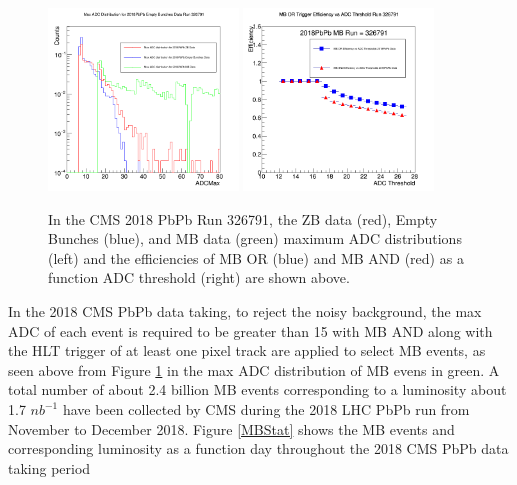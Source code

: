 \begin{figure}[hbtp]
\begin{center}
\includegraphics[width=0.45\textwidth]{Figures/Chapter2/MaxADC.png}
\includegraphics[width=0.45\textwidth]{Figures/Chapter2/MBTrgEffADC.png}
\caption{In the CMS 2018 PbPb Run 326791, the ZB data (red), Empty Bunches (blue), and MB data (green) maximum ADC distributions (left) and the efficiencies of MB OR (blue) and MB AND (red) as a function ADC threshold (right) are shown above.}
\label{2018PbPbMB}
\end{center}
\end{figure} 

In the 2018 CMS PbPb data taking, to reject the noisy background, the max ADC of each event is required to be greater than 15 with MB AND along with the HLT trigger of at least one pixel track are applied to select MB events, as seen above from Figure \ref{2018PbPbMB} in the max ADC distribution of MB evens in green. A total number of about 2.4 billion MB events corresponding to a luminosity about 1.7 $nb^{-1}$ have been collected by CMS during the 2018 LHC PbPb run from November to December 2018. Figure \ref{MBStat} shows the MB events and corresponding luminosity as a function day throughout the 2018 CMS PbPb data taking period

